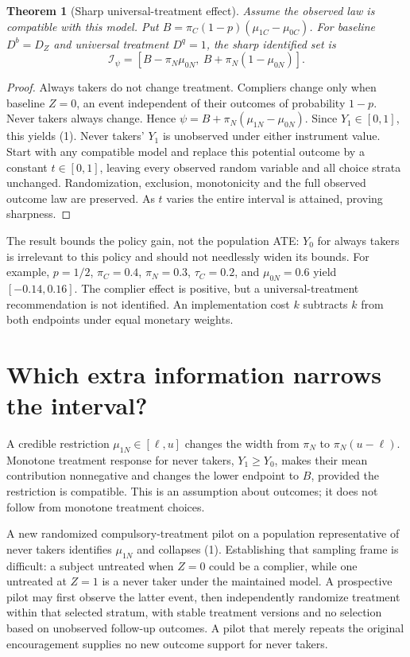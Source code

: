 \documentclass[11pt]{article}
\newtheorem{theorem}{Theorem}
\theoremstyle{definition}
\begin{document}
\begin{theorem}[Sharp universal-treatment effect]
Assume the observed law is compatible with this model. Put
$B=\pi_C(1-p)(\mu_{1C}-\mu_{0C})$.
For baseline $D^b=D_Z$ and universal treatment $D^q=1$, the sharp identified set is
\[
 \mathcal I_\psi=[B-\pi_N\mu_{0N},\ B+\pi_N(1-\mu_{0N})].       \tag{1}
\]
\end{theorem}
\begin{proof}
Always takers do not change treatment. Compliers change only when baseline
$Z=0$, an event independent of their outcomes of probability $1-p$. Never
takers always change. Hence
$\psi=B+\pi_N(\mu_{1N}-\mu_{0N})$. Since $Y_1\in[0,1]$, this yields (1).
Never takers' $Y_1$ is unobserved under either instrument value. Start with
any compatible model and replace this potential outcome by a constant
$t\in[0,1]$, leaving every observed random variable and all choice strata
unchanged. Randomization, exclusion, monotonicity and the full observed outcome
law are preserved. As $t$ varies the entire interval is attained, proving sharpness.
\end{proof}
The result bounds the policy gain, not the population ATE: $Y_0$ for always
takers is irrelevant to this policy and should not needlessly widen its bounds.
For example, $p=1/2$, $\pi_C=0.4$, $\pi_N=0.3$, $\tau_C=0.2$, and
$\mu_{0N}=0.6$ yield $[-0.14,0.16]$. The complier effect is positive, but a
universal-treatment recommendation is not identified. An implementation cost
$k$ subtracts $k$ from both endpoints under equal monetary weights.

\section*{Which extra information narrows the interval?}
A credible restriction $\mu_{1N}\in[\ell,u]$ changes the width from $\pi_N$
to $\pi_N(u-\ell)$. Monotone treatment response for never takers,
$Y_1\ge Y_0$, makes their mean contribution nonnegative and changes the lower
endpoint to $B$, provided the restriction is compatible. This is an assumption
about outcomes; it does not follow from monotone treatment choices.

A new randomized compulsory-treatment pilot on a population representative of
never takers identifies $\mu_{1N}$ and collapses (1). Establishing that sampling
frame is difficult: a subject untreated when $Z=0$ could be a complier, while
one untreated at $Z=1$ is a never taker under the maintained model. A prospective
pilot may first observe the latter event, then independently randomize treatment
within that selected stratum, with stable treatment versions and no selection
based on unobserved follow-up outcomes. A pilot that merely repeats the original
encouragement supplies no new outcome support for never takers.
\end{document}
